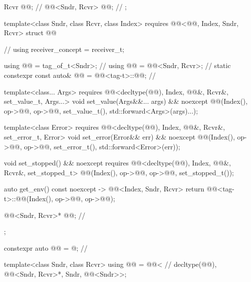 \begin{codeblock}
{{    Rcvr @@;                                                  // \expos
    @@<Sndr, Rcvr> @@;                               // \expos
  };

  template<class Sndr, class Rcvr, class Index>
    requires @@<@@, Index, Sndr, Rcvr>
  struct @@ {                                       // \expos
    using receiver_concept = receiver_t;

    using @@ = tag_of_t<Sndr>;                               // \expos
    using @@ = @@<Sndr, Rcvr>;                     // \expos
    static constexpr const auto& @@ = @@<tag-t>::@@;   // \expos

    template<class... Args>
      requires @@<decltype(@@), Index, @@&, Rcvr&, set_value_t, Args...>
    void set_value(Args&&... args) && noexcept {
      @@(Index(), op->@@, op->@@, set_value_t(), std::forward<Args>(args)...);
    }

    template<class Error>
      requires @@<decltype(@@), Index, @@&, Rcvr&, set_error_t, Error>
    void set_error(Error&& err) && noexcept {
      @@(Index(), op->@@, op->@@, set_error_t(), std::forward<Error>(err));
    }

    void set_stopped() && noexcept
      requires @@<decltype(@@), Index, @@&, Rcvr&, set_stopped_t> {
      @@(Index(), op->@@, op->@@, set_stopped_t());
    }

    auto get_env() const noexcept -> @@<Index, Sndr, Rcvr> {
      return @@<tag-t>::@@(Index(), op->@@, op->@@);
    }

    @@<Sndr, Rcvr>* @@;                           // \expos
  };

  constexpr auto @@ = @\seebelow@;                         // \expos

  template<class Sndr, class Rcvr>
  using @@ = @@<                     // \expos
    decltype(@@), @@<Sndr, Rcvr>*, Sndr, @@<Sndr>>;

}
\end{codeblock}
